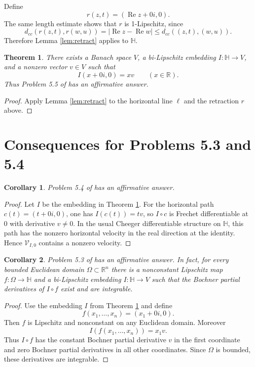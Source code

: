 \documentclass[11pt]{amsart}
\newtheorem{theorem}{Theorem}
\newtheorem{corollary}{Corollary}
\newcommand{\R}{\mathbb R}
\newcommand{\Hh}{\mathbb H}
\newcommand{\Repart}{\operatorname{Re}}
\begin{document}
Define
\[
 r(z,t)=(\Repart z+0i,0).
\]
The same length estimate shows that $r$ is 1-Lipschitz, since
\[
 d_{cc}(r(z,t),r(w,u))=|\Repart z-\Repart w|\le d_{cc}((z,t),(w,u)).
\]
Therefore Lemma \ref{lem:retract} applies to $\Hh$.

\begin{theorem}
\label{thm:problem55}
There exists a Banach space $V$, a bi-Lipschitz embedding
$I:\Hh\to V$, and a nonzero vector $v\in V$ such that
\[
 I(x+0i,0)=xv
 \qquad (x\in\R).
\]
Thus Problem 5.5 of \cite{Wildrick} has an affirmative answer.
\end{theorem}

\begin{proof}
Apply Lemma \ref{lem:retract} to the horizontal line $\ell$ and the retraction
$r$ above.
\end{proof}

\section*{Consequences for Problems 5.3 and 5.4}

\begin{corollary}
Problem 5.4 of \cite{Wildrick} has an affirmative answer.
\end{corollary}

\begin{proof}
Let $I$ be the embedding in Theorem \ref{thm:problem55}.  For the horizontal
path $c(t)=(t+0i,0)$, one has $I(c(t))=tv$, so $I\circ c$ is Frechet
differentiable at $0$ with derivative $v\ne0$.  In the usual Cheeger
differentiable structure on $\Hh$, this path has the nonzero horizontal
velocity in the real direction at the identity.  Hence
$\mathcal V_{I,0}$ contains a nonzero velocity.
\end{proof}

\begin{corollary}
Problem 5.3 of \cite{Wildrick} has an affirmative answer.  In fact, for every
bounded Euclidean domain $\Omega\subset\R^n$ there is a nonconstant Lipschitz
map $f:\Omega\to\Hh$ and a bi-Lipschitz embedding $I:\Hh\to V$ such that the
Bochner partial derivatives of $I\circ f$ exist and are integrable.
\end{corollary}

\begin{proof}
Use the embedding $I$ from Theorem \ref{thm:problem55} and define
\[
 f(x_1,\ldots,x_n)=(x_1+0i,0).
\]
Then $f$ is Lipschitz and nonconstant on any Euclidean domain.  Moreover
\[
 I(f(x_1,\ldots,x_n))=x_1v.
\]
Thus $I\circ f$ has the constant Bochner partial derivative $v$ in the first
coordinate and zero Bochner partial derivatives in all other coordinates.
Since $\Omega$ is bounded, these derivatives are integrable.
\end{proof}
\end{document}
